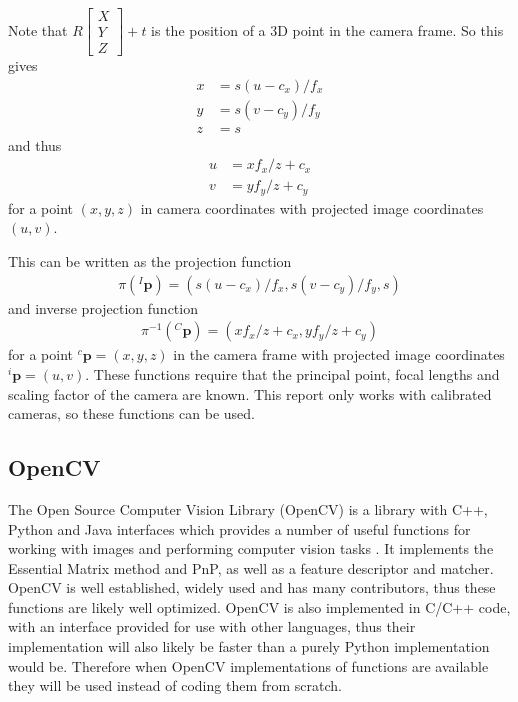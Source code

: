 \documentclass[12pt,a4paper]{article}
\begin{document}
    Note that $R \begin{bmatrix} X \\ Y \\ Z \end{bmatrix} + t $ is the position of a 3D point in the camera frame. So this gives
    \begin{align*}
    x &= s(u-c_x)/f_x \\
    y &= s(v-c_y)/f_y \\
    z &= s
    \end{align*}
    and thus
    \begin{align*}
    u &= xf_x/z + c_x \\
    v &= yf_y/z + c_y
    \end{align*}    
    for a point $(x,y,z)$ in camera coordinates with projected image coordinates $(u,v)$. 
     
    This can be written as the projection function 
    \begin{align*}
    \pi(^I\textbf{p}) = (s(u-c_x)/f_x, s(v-c_y)/f_y, s)
    \end{align*}
    and inverse projection function
    \begin{align*}
    \pi^{-1}(^C\textbf{p}) = (xf_x/z + c_x, yf_y/z + c_y)
    \end{align*}
    for a point $^c\textbf{p} = (x,y,z)$ in the camera frame with projected image coordinates $^i\textbf{p} = (u,v)$. These functions require that the principal point, focal lengths and scaling factor of the camera are known. This report only works with calibrated cameras, so these functions can be used.

  \subsection{OpenCV}
    \label{ssec: BI OpenCV}
    The Open Source Computer Vision Library (OpenCV) is a library with C++, Python and Java interfaces which provides a number of useful functions for working with images and performing computer vision tasks \cite{openCV}. It implements the Essential Matrix method and PnP, as well as a feature descriptor and matcher. OpenCV is well established, widely used and has many contributors, thus these functions are likely well optimized. OpenCV is also implemented in C/C++ code, with an interface provided for use with other languages, thus their implementation will also likely be faster than a purely Python implementation would be. Therefore when OpenCV implementations of functions are available they will be used instead of coding them from scratch.
     
\end{document}
